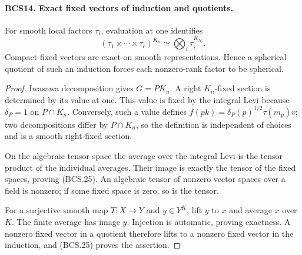 \documentclass[11pt,a4paper]{article}
\numberwithin{equation}{section}
\theoremstyle{remark}\newtheorem{remark}[theorem]{Remark}
\begin{document}
\paragraph{BCS14. Exact fixed vectors of induction and quotients.}
\label{claim:BCS14}
For smooth local factors \(\tau_i\), evaluation at one identifies
\[
 (\tau_1\times\cdots\times\tau_c)^{K_n}
                  \simeq\bigotimes_i\tau_i^{K_{N_i}}.
 \tag{BCS.25}
\]
Compact fixed vectors are exact on smooth representations.  Hence a
spherical quotient of such an induction forces each nonzero-rank
factor to be spherical.
\begin{proof}
Iwasawa decomposition gives \(G=PK_n\).  A right \(K_n\)-fixed
section is determined by its value at one.  This value is fixed by
the integral Levi because \(\delta_P=1\) on \(P\cap K_n\).
Conversely, such a value defines
\(f(pk)=\delta_P(p)^{1/2}\tau(m_p)v\); two decompositions
differ by \(P\cap K_n\), so the definition is independent of
choices and is a smooth right-fixed section.

On the algebraic tensor space the average over the integral Levi is
the tensor product of the individual averages.  Their image is
exactly the tensor of the fixed spaces, proving (BCS.25).  An
algebraic tensor of nonzero vector spaces over a field is nonzero;
if some fixed space is zero, so is the tensor.

For a surjective smooth map \(T:X\to Y\) and \(y\in Y^K\),
lift \(y\) to \(x\) and average \(x\) over \(K\).  The finite
average has image \(y\).  Injection is automatic, proving exactness.
A nonzero fixed vector in a quotient therefore lifts to a nonzero
fixed vector in the induction, and (BCS.25) proves the assertion.
\end{proof}

\end{document}
